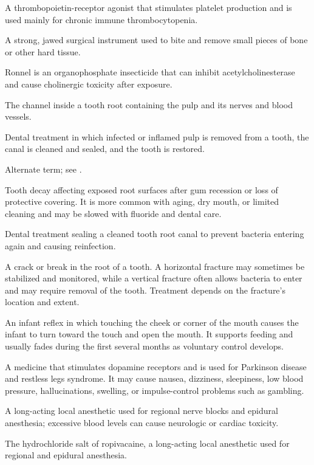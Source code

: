  A thrombopoietin-receptor agonist that stimulates platelet production and is used mainly for chronic immune thrombocytopenia.

 A strong, jawed surgical instrument used to bite and remove small pieces of bone or other hard tissue.

 Ronnel is an organophosphate insecticide that can inhibit acetylcholinesterase and cause cholinergic toxicity after exposure.

 The channel inside a tooth root containing the pulp and its nerves and blood vessels.

 Dental treatment in which infected or inflamed pulp is removed from a tooth, the canal is cleaned and sealed, and the tooth is restored.

 Alternate term; see .

 Tooth decay affecting exposed root surfaces after gum recession or loss of protective covering. It is more common with aging, dry mouth, or limited cleaning and may be slowed with fluoride and dental care.

 Dental treatment sealing a cleaned tooth root canal to prevent bacteria entering again and causing reinfection.

 A crack or break in the root of a tooth. A horizontal fracture may sometimes be stabilized and monitored, while a vertical fracture often allows bacteria to enter and may require removal of the tooth. Treatment depends on the fracture’s location and extent.

 An infant reflex in which touching the cheek or corner of the mouth causes the infant to turn toward the touch and open the mouth. It supports feeding and usually fades during the first several months as voluntary control develops.

 A medicine that stimulates dopamine receptors and is used for Parkinson disease and restless legs syndrome. It may cause nausea, dizziness, sleepiness, low blood pressure, hallucinations, swelling, or impulse-control problems such as gambling.

 A long-acting local anesthetic used for regional nerve blocks and epidural anesthesia; excessive blood levels can cause neurologic or cardiac toxicity.

 The hydrochloride salt of ropivacaine, a long-acting local anesthetic used for regional and epidural anesthesia.

